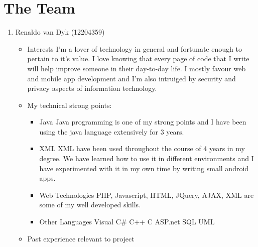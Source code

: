 \documentclass[12pt, oneside]{article}
\begin{document}
\section{The Team}
	\begin{enumerate}
		\item {Renaldo van Dyk (12204359)\par}
			
		\begin{itemize}		
			\texttt{[image: Renaldo]} %
			\item Interests\newline\newline
				I'm a lover of technology in general and fortunate enough to pertain to it's value. I love knowing that 
				every page of code that I write will help improve someone in their day-to-day life. I mostly favour web and 
				mobile app development and I'm also intruiged by security and privacy aspects of information technology.\newline
			\item My technical strong points:
				\begin{itemize}
				\item Java\newline
					Java programming is one of my strong points and I have been using the java language extensively for 3 years.
				\item XML\newline
					XML have been used throughout the course of 4 years in my degree. We have learned how to use it 
					in different environments and I have experimented with it in my own time by writing small android apps.
				\item Web Technologies\newline
					PHP, Javascript, HTML, JQuery, AJAX, XML are some of my well developed skills.
				\item Other Languages\newline
					Visual C\#\newline
					C++\newline
					C\newline
					ASP.net\newline
					SQL\newline
					UML\newline	
				\end{itemize}				
			\item Past experience relevant to project\newline\newline

\end{itemize}
\end{enumerate}
\end{document}
